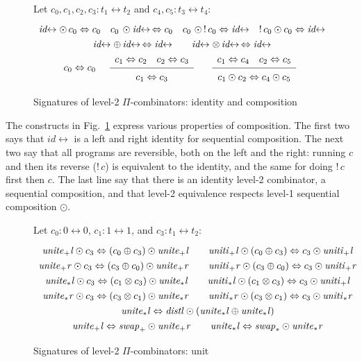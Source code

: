 \documentclass{article}
\newcommand{\identlp}{\ensuremath{\mathit{unite}_+\mathit{l}}}
\newcommand{\identrp}{\ensuremath{\mathit{uniti}_+\mathit{l}}}
\newcommand{\identlsp}{\ensuremath{\mathit{unite}_+\mathit{r}}}
\newcommand{\identrsp}{\ensuremath{\mathit{uniti}_+\mathit{r}}}
\newcommand{\swapp}{\ensuremath{\mathit{swap}_+}}
\newcommand{\identlt}{\ensuremath{\mathit{unite}_*\mathit{l}}}
\newcommand{\identrt}{\ensuremath{\mathit{uniti}_*\mathit{l}}}
\newcommand{\identlst}{\ensuremath{\mathit{unite}_*\mathit{r}}}
\newcommand{\identrst}{\ensuremath{\mathit{uniti}_*\mathit{r}}}
\newcommand{\swapt}{\ensuremath{\mathit{swap}_*}}
\newcommand{\distl}{\ensuremath{\mathit{distl}}}
\newcommand{\idc}{\mathit{id}\!\!\leftrightarrow}
\newcommand{\Rule}[4]{
\makebox{{\rm #1}
$\displaystyle
\frac{\begin{array}{l}#2 \\\end{array}}
{\begin{array}{l}#3      \\\end{array}}$
 #4}}
\begin{document}
\begin{figure}[t]
Let $c_0, c_1, c_2, c_3 : t_1 \leftrightarrow t_2$ and $c_4, c_5 : t_3 \leftrightarrow t_4$:
\[\def\arraystretch{1.3}
\begin{array}{c}
  {\idc \odot \, c_0 \Leftrightarrow c_0}
\quad
  {c_0 \, \odot \idc \, \Leftrightarrow c_0}
\quad
  {c_0\,\, \odot\,!\, c_0 \Leftrightarrow \idc}
\quad
  {!\, c_0 \odot c_0 \Leftrightarrow \idc}
\\
  {\idc \oplus \, \idc \, \Leftrightarrow \idc}
\qquad
  {\idc \otimes \, \idc \, \Leftrightarrow \idc}
\\
  {c_0 \Leftrightarrow c_0}
\quad
\Rule{}
  {c_1 \Leftrightarrow c_2 \quad c_2 \Leftrightarrow c_3}
  {c_1 \Leftrightarrow c_3}
  {}
\quad
\Rule{}
  {c_1 \Leftrightarrow c_4 \quad c_2 \Leftrightarrow c_5}
  {c_1 \odot c_2 \Leftrightarrow c_4 \odot c_5}
  {}
\end{array}\]
\caption{\label{figh}Signatures of level-2 $\Pi$-combinators: identity and composition}
\end{figure}

The constructs in Fig.~\ref{figh} express various properties of composition.
The first two says that $\idc$ is a left and right identity for sequential composition.
The next two say that all programs are reversible, both on the left and the right:
running $c$ and then its reverse ($!\, c$) is equivalent to the identity, and the
same for doing $!\, c$ first then $c$. The last line say that there is an
identity level-2 combinator, a sequential composition, and that level-2
equivalence respects level-1 sequential composition $\odot$.

\begin{figure}[t]
Let $c_0 : 0 \leftrightarrow 0$, $c_1 : 1 \leftrightarrow 1$, and $c_3 : t_1 \leftrightarrow t_2$:
\[\def\arraystretch{1.3}
\begin{array}{c}
  {\identlp \odot c_3 \Leftrightarrow (c_0 \oplus c_3) \odot \identlp}
\qquad
  {\identrp \odot (c_0 \oplus c_3) \Leftrightarrow c_3 \odot \identrp}
\\
  {\identlsp \odot c_3 \Leftrightarrow (c_3 \oplus c_0) \odot \identlsp}
\qquad
  {\identrsp \odot (c_3 \oplus c_0) \Leftrightarrow c_3 \odot \identrsp}
\\
  {\identlt \odot c_3 \Leftrightarrow (c_1 \otimes c_3) \odot \identlt}
\qquad
  {\identrt \odot (c_1 \otimes c_3) \Leftrightarrow c_3 \odot \identrp}
\\
  {\identlst \odot c_3 \Leftrightarrow (c_3 \otimes c_1) \odot \identlst}
\qquad
  {\identrst \odot (c_3 \otimes c_1) \Leftrightarrow c_3 \odot \identrst}
\\
  {\identlt \Leftrightarrow \distl \odot (\identlt \oplus \identlt)}
\\
\identlp \Leftrightarrow \swapp \odot \identlsp
\qquad
\identlt \Leftrightarrow \swapt \odot \identlst
\end{array}\]
\caption{\label{figg}Signatures of level-2 $\Pi$-combinators: unit}
\end{figure}
\end{document}
